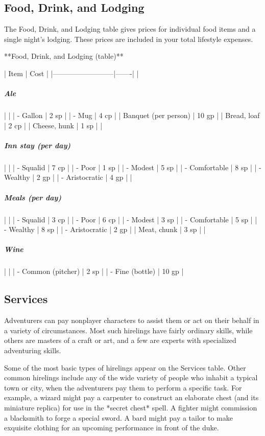 \subsection{Food, Drink, and Lodging}

The Food, Drink, and Lodging table gives prices for individual food items and a single night's lodging. These prices are included in your total lifestyle expenses.

**Food, Drink, and Lodging (table)**

| Item                     | Cost  |
|--------------------------|-------|
| \subparagraph*{Ale}                |       |
| - Gallon                 | 2 sp  |
| - Mug                    | 4 cp  |
| Banquet (per person)     | 10 gp |
| Bread, loaf              | 2 cp  |
| Cheese, hunk             | 1 sp  |
| \subparagraph*{Inn stay (per day)} |       |
| - Squalid                | 7 cp  |
| - Poor                   | 1 sp  |
| - Modest                 | 5 sp  |
| - Comfortable            | 8 sp  |
| - Wealthy                | 2 gp  |
| - Aristocratic           | 4 gp  |
| \subparagraph*{Meals (per day)}    |       |
| - Squalid                | 3 cp  |
| - Poor                   | 6 cp  |
| - Modest                 | 3 sp  |
| - Comfortable            | 5 sp  |
| - Wealthy                | 8 sp  |
| - Aristocratic           | 2 gp  |
| Meat, chunk              | 3 sp  |
| \subparagraph*{Wine}               |       |
| - Common (pitcher)       | 2 sp  |
| - Fine (bottle)          | 10 gp |

\subsection{Services}

Adventurers can pay nonplayer characters to assist them or act on their behalf in a variety of circumstances. Most such hirelings have fairly ordinary skills, while others are masters of a craft or art, and a few are experts with specialized adventuring skills.

Some of the most basic types of hirelings appear on the Services table. Other common hirelings include any of the wide variety of people who inhabit a typical town or city, when the adventurers pay them to perform a specific task. For example, a wizard might pay a carpenter to construct an elaborate chest (and its miniature replica) for use in the *secret chest* spell. A fighter might commission a blacksmith to forge a special sword. A bard might pay a tailor to make exquisite clothing for an upcoming performance in front of the duke.

